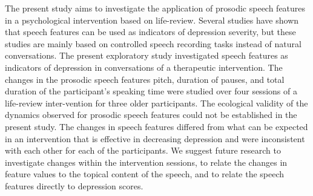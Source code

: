 The present study aims to investigate the   application of prosodic speech features in a psychological intervention based on life-review. Several studies have shown that speech features can be used as indicators of depression severity, but these studies are mainly based on controlled speech recording tasks instead of natural conversations. The present exploratory study investigated speech features as indicators of depression in conversations of a therapeutic intervention. The changes in the prosodic speech features pitch, duration of pauses, and total duration of the participant's speaking time were studied over four sessions of a life-review inter-vention for three older participants. The ecological validity of the dynamics observed for prosodic speech features could not be established in the present study. The changes in speech features differed from what can be expected in an intervention that is effective in decreasing depression and were inconsistent with each other for each of the participants. We suggest future research to investigate changes within the intervention sessions, to relate the changes in feature values to the topical content of the speech, and to relate the speech features directly to depression scores.
